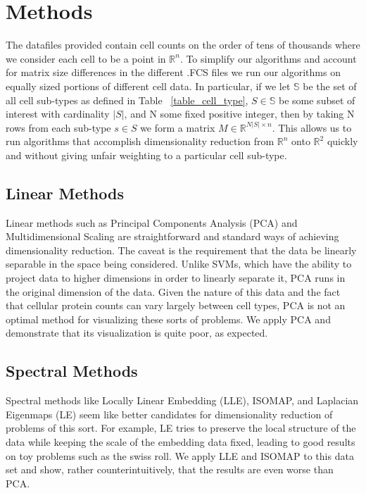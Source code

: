 \documentclass{article}
\begin{document}
\section{Methods}
\label{methods}

The datafiles provided contain cell counts on the order of tens of thousands where we consider each cell to be a point in $\mathbb{R}^n$. To simplify our algorithms and account for matrix size differences in the different .FCS files we run our algorithms on equally sized portions of different cell data. In particular, if we let $\mathbb{S}$ be the set of all cell sub-types as defined in Table ~\ref{table_cell_type}, $S \in \mathbb{S}$  be some subset of interest with cardinality $|S|$, and N some fixed positive integer, then by taking N rows from each sub-type $s \in S$ we form a matrix $M \in \mathbb{R}^{N |S| \times n}$. This allows us to run algorithms that accomplish dimensionality reduction from $\mathbb{R}^n$ onto $\mathbb{R}^2$ quickly and without giving unfair weighting to a particular cell sub-type.


\subsection{Linear Methods}
Linear methods such as Principal Components Analysis (PCA) and Multidimensional Scaling are straightforward and standard ways of achieving dimensionality reduction. The caveat is the requirement that the data be linearly separable in the space being considered. Unlike SVMs, which have the ability to project data to higher dimensions in order to linearly separate it, PCA runs in the original dimension of the data. Given the nature of this data and the fact that cellular protein counts can vary largely between cell types, PCA is not an optimal method for visualizing these sorts of problems. We apply PCA and demonstrate that its visualization is quite poor, as expected.

\subsection{Spectral Methods}
Spectral methods like Locally Linear Embedding (LLE), ISOMAP, and Laplacian Eigenmaps (LE) seem like better candidates for dimensionality reduction of problems of this sort. For example, LE tries to preserve the local structure of the data while keeping the scale of the embedding data fixed, leading to good results on toy problems such as the swiss roll. We apply LLE and ISOMAP to this data set and show, rather counterintuitively, that the results are even worse than PCA.
\end{document}
